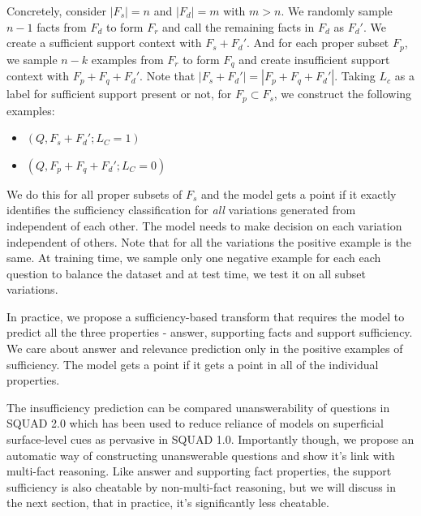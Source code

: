{
Concretely, consider $|F_s| = n$ and $|F_d| = m$ with $m>n$. We randomly sample $n-1$ facts from $F_d$ to form $F_r$ and call the remaining facts in $F_d$ as $F_d'$. We create a sufficient support context with $F_s + F_d'$. And for each proper subset $F_p$, we sample $n-k$ examples from $F_r$ to form $F_q$ and create insufficient support context with $F_p + F_q + F_d'$. Note that $|F_s+F_d'| = |F_p + F_q + F_d'|$. Taking $L_c$ as a label for sufficient support present or not, for $F_p \subset F_s$, we construct the following examples:

\begin{itemize}[noitemsep]
    \item $(Q, F_s + F_d'; L_C=1)$
    \item $(Q, F_p + F_q + F_d'; L_C=0)$
\end{itemize}

We do this for all proper subsets of $F_s$ and the model gets a point if it exactly identifies the sufficiency classification for \textit{all} variations generated from independent of each other.  The model needs to make decision on each variation independent of others. Note that for all the variations the positive example is the same. At training time, we sample only one negative example for each each question to balance the dataset and at test time, we test it on all subset variations.

In practice, we propose a sufficiency-based transform that requires the model to predict all the three properties - answer, supporting facts and support sufficiency. We care about answer and relevance prediction only in the positive examples of sufficiency. The model gets a point if it gets a point in all of the individual properties.

The insufficiency prediction can be compared unanswerability of questions in SQUAD 2.0 which has been used to reduce reliance of models on superficial surface-level cues as pervasive in SQUAD 1.0. Importantly though, we propose an automatic way of constructing unanswerable questions and show it's link with multi-fact reasoning. Like answer and supporting fact properties, the support sufficiency is also cheatable by non-multi-fact reasoning, but we will discuss in the next section, that in practice, it's significantly less cheatable.

}


